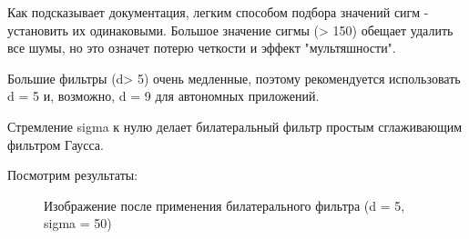 \documentclass[14pt,a4paper,report]{report}
\begin{document}
Как подсказывает документация, легким способом подбора значений сигм - установить их одинаковыми. Большое значение сигмы (> 150) обещает удалить все шумы, но это означет потерю четкости и эффект "мультяшности".

Большие фильтры (d> 5) очень медленные, поэтому рекомендуется использовать d = 5 и, возможно, d = 9 для автономных приложений.

Стремление sigma к нулю делает билатеральный фильтр простым сглаживающим фильтром Гаусса.

\clearpage

Посмотрим результаты:


\begin{figure}[h]
\begin{minipage}[h]{0.47\linewidth}
\end{minipage}
\hfill
\begin{minipage}[h]{0.47\linewidth}
\end{minipage}
\caption{Изображение после применения билатерального фильтра (d = 5, sigma = 50)}
\label{ris:image1}
\end{figure}
\end{document}

